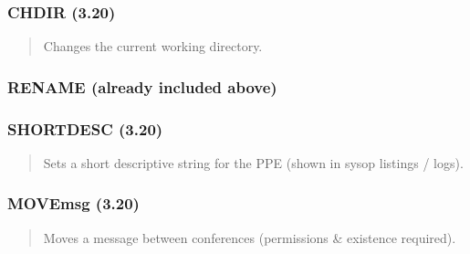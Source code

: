 \documentclass[letterpaper,10pt,english]{sphinxmanual}
\begin{document}
\subsubsection{CHDIR (3.20)}
\label{\detokenize{ppl:chdir-3-20}}\begin{quote}

\sphinxAtStartPar
{}
\begin{description}
\sphinxAtStartPar
Changes the current working directory.

\end{description}
\end{quote}


\subsubsection{RENAME (already included above)}
\label{\detokenize{ppl:rename-already-included-above}}

\subsubsection{SHORTDESC (3.20)}
\label{\detokenize{ppl:shortdesc-3-20}}\begin{quote}

\sphinxAtStartPar
{}
\begin{description}
\sphinxAtStartPar
Sets a short descriptive string for the PPE (shown in sysop listings / logs).

\end{description}
\end{quote}


\subsubsection{MOVEmsg (3.20)}
\label{\detokenize{ppl:movemsg-3-20}}\begin{quote}

\sphinxAtStartPar
{}
\begin{description}
\sphinxAtStartPar
Moves a message between conferences (permissions \& existence required).

\end{description}
\end{quote}
\end{document}
